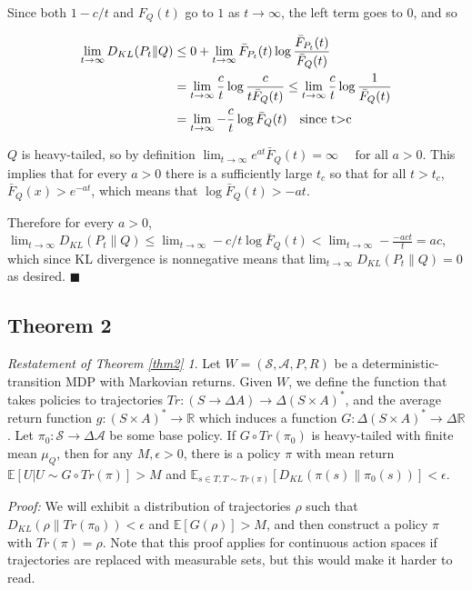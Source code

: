 \documentclass{article}
\theoremstyle{plain}
\theoremstyle{definition}
\theoremstyle{remark}
\begin{document}
Since both \(1-c/t\) and \(F_Q(t)\) go to \(1\) as \(t \to \infty\), the
left term goes to \(0\), and so

\begin{align*}\lim_{t \to \infty} D_{KL}(P_t \| Q)&\le 0 + \lim_{t \to \infty}\bar F_{P_t}(t) \log \frac{\bar F_{P_t}(t)
}{\bar F_Q(t)}
\\ & = \lim_{t \to \infty}\frac c t \log \frac c {t \bar F_Q(t)} \le \lim_{t \to \infty} \frac c t \log \frac 1 {\bar F_Q(t)} 
\\&= \lim_{t \to \infty}-\frac c t \log \bar F_Q(t) \text{\quad since t>c}
\end{align*}

\(Q\) is heavy-tailed, so by definition
\(\lim _{t \rightarrow \infty} e^{a t} \bar{F}_Q(t)=\infty \quad \text { for all } a>0\).
This implies that for every \(a > 0\) there is a sufficiently large
\(t_{c}\) so that for all \(t > t_c\), \(\bar F_Q(x) > e^{-at}\), which
means that \(\log \bar F_Q(t) > -a t\).

Therefore for every \(a > 0\),
\(\lim_{t \to \infty} D_{KL}(P_t \| Q) \le \lim_{t \to \infty} -c/t \log \bar F_Q(t) < \lim_{t \to \infty} -\frac {-act} t = ac\),
which since KL divergence is nonnegative means
that\(\lim_{t \to \infty} D_{KL}(P_t \| Q) = 0\) as desired.
\(\blacksquare\)

\subsection{Theorem 2}
\newtheorem*{theorem2}{Restatement of Theorem \ref{thm2}}
\begin{theorem2}
Let \(W = (\mathcal S, \mathcal A, P, R)\) be
a deterministic-transition MDP with Markovian returns. Given \(W\), we
define the function that takes policies to trajectories
\(Tr: (S \to \Delta A) \to \Delta(S \times A)^*\), and the average
return function \(g: (S \times A)^* \to \mathbb R\) which induces a
function \(G: \Delta(S \times A)^* \to \Delta \mathbb R\). Let
\(\pi_0: \mathcal S \to \Delta \mathcal A\) be some base policy. If
\(G \circ Tr(\pi_0)\) is heavy-tailed with finite mean \(\mu_Q\), then
for any \(M, \epsilon > 0\), there is a policy \(\pi\) with mean return
\(\mathbb E[U | U \sim G \circ Tr(\pi)] > M\) and
\(\mathbb E_{s \in T, T\sim Tr(\pi)}[D_{KL}(\pi(s) \| \pi_0(s))] < \epsilon\).
\end{theorem2}

\emph{Proof:} We will exhibit a distribution of trajectories \(\rho\)
such that \(D_{KL}(\rho \| Tr(\pi_0)) < \epsilon\) and
\(\mathbb E[G(\rho)] > M\), and then construct a policy \(\pi\) with
\(Tr(\pi) = \rho\). Note that this proof applies for continuous action
spaces if trajectories are replaced with measurable sets, but this would
make it harder to read.
\end{document}
